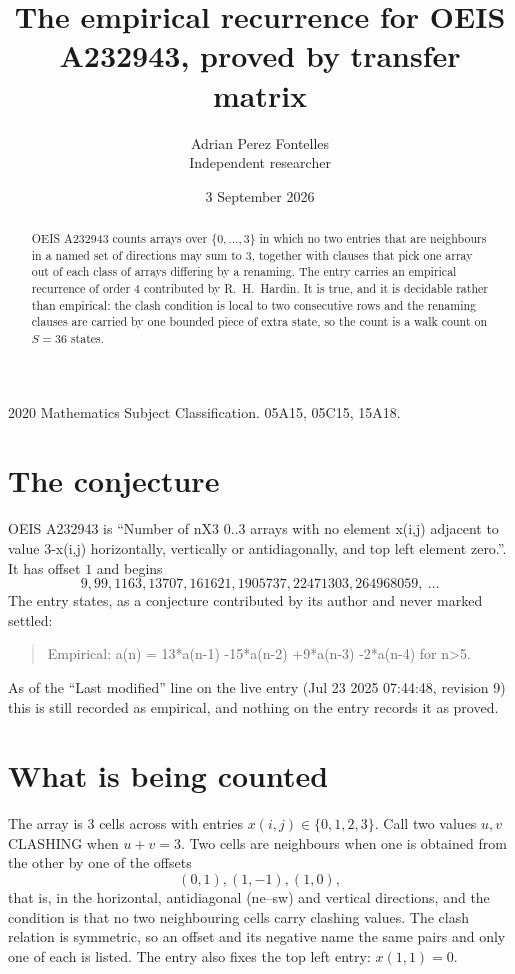 \documentclass[11pt,a4paper]{article}
\title{The empirical recurrence for OEIS A232943, proved by transfer matrix}
\author{Adrian Perez Fontelles\\ \small Independent researcher}
\date{3 September 2026}
\theoremstyle{plain}
\theoremstyle{definition}
\begin{document}
\maketitle

\begin{abstract}
OEIS A232943 counts arrays over $\{0,\dots,3\}$ in which no two entries that are neighbours in
a named set of directions may sum to $3$, together with clauses that pick one array out of
each class of arrays differing by a renaming. The entry carries an empirical recurrence of
order $4$ contributed by R.~H.~Hardin. It is true, and it is decidable rather than
empirical: the clash condition is local to two consecutive rows and the renaming clauses are
carried by one bounded piece of extra state, so the count is a walk count on $S=36$ states.
\end{abstract}

\noindent\small 2020 Mathematics Subject Classification. 05A15, 05C15, 15A18.\normalsize

\section{The conjecture}

OEIS A232943 is ``Number of nX3 0..3 arrays with no element x(i,j) adjacent to value 3-x(i,j) horizontally, vertically or antidiagonally, and top left element zero.''. It has offset $1$ and begins
\[
9, 99, 1163, 13707, 161621, 1905737, 22471303, 264968059,\ \dots
\]
The entry states, as a conjecture contributed by its author and never marked settled:
\begin{quote}
Empirical: a(n) = 13*a(n-1) -15*a(n-2) +9*a(n-3) -2*a(n-4) for n>5.
\end{quote}
As of the ``Last modified'' line on the live entry (Jul 23 2025 07:44:48, revision 9) this is still
recorded as empirical, and nothing on the entry records it as proved.

\section{What is being counted}

The array is $3$ cells across with entries $x(i,j)\in\{0,1,2,3\}$. Call two values $u,v$ CLASHING
when $u+v=3$. Two cells are neighbours when one is obtained from the other by one of
the offsets
\[
(0,1), (1,-1), (1,0),
\]
that is, in the horizontal, antidiagonal (ne--sw) and vertical directions, and the condition is that no two neighbouring cells carry
clashing values. The clash relation is symmetric, so an offset and its negative name the
same pairs and only one of each is listed. The entry also fixes the top left entry: $x(1,1)=0$.
\end{document}
